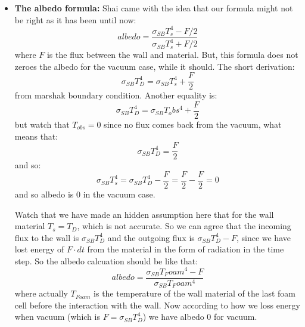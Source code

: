 \documentclass[11pt,a4paper]{article}
\begin{document}
\begin{itemize}
    \item \textbf{The albedo formula:} 
    Shai came with the idea that our formula might not be right as it has been until now:
    \begin{equation}
        albedo = \frac{\sigma_{SB}T_s^4 - F/2}{\sigma_{SB}T_s^4 + F/2}
    \end{equation} 
    where $F$ is the flux between the wall and material. But, this formula does not zeroes the albedo for the vacuum case, while it should. 
    The short derivation: 
    \begin{equation}
        \sigma_{SB}T_D^4 = \sigma_{SB}T_s^4 + \frac{F}{2} 
    \end{equation}
    from marshak boundary condition. Another equality is:
    \begin{equation}
        \sigma_{SB}T_D^4 = \sigma_{SB}T_obs^4 + \frac{F}{2} 
    \end{equation}
    but watch that $T_{obs} = 0$ since no flux comes back from the vacuum, what means that: 
    \begin{equation}
        \sigma_{SB}T_D^4 = \frac{F}{2} 
    \end{equation}
    and so:
    \begin{equation}
        \sigma_{SB}T_s^4 = \sigma_{SB}T_D^4 - \frac{F}{2} = \frac{F}{2} - \frac{F}{2} = 0
    \end{equation}
    and so albedo is 0 in the vacuum case. 
    
    Watch that we have made an hidden assumption here that for the wall material $T_s = T_D$, which is not accurate. So we can agree that the incoming flux to the wall is $\sigma_{SB}T_D^4$ and the outgoing flux is $\sigma_{SB}T_D^4 - F$, since we have lost energy of $F\cdot dt$ from the material in the form of radiation in the time step. So the albedo calcuation should be like that:
    \begin{equation}
        albedo = \frac{\sigma_{SB}T_Foam^4 - F}{\sigma_{SB}T_Foam^4}
    \end{equation}
    where actually $T_{Foam}$ is the temperature of the wall material of the last foam cell before the interaction with the wall. Now according to how we loss energy when vacuum (which is $F = \sigma_{SB}T_D^4$) we have albedo 0 for vacuum.
    
\end{itemize}
\end{document}
